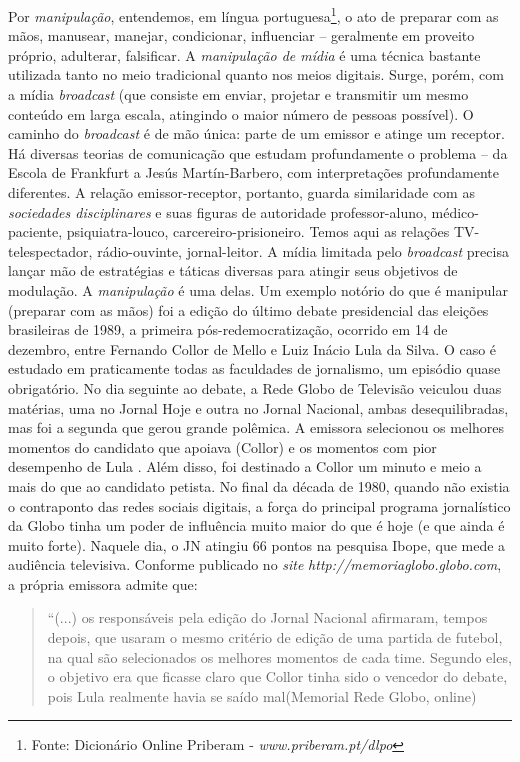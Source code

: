Por \emph{manipulação}, entendemos, em língua portuguesa\footnote{Fonte:
  Dicionário Online Priberam -
  \emph{www.priberam.pt/dlpo}}, o
ato de preparar com as mãos, manusear, manejar, condicionar, influenciar
-- geralmente em proveito próprio, adulterar, falsificar. A
\emph{manipulação de mídia} é uma técnica bastante utilizada tanto no
meio tradicional quanto nos meios digitais. Surge, porém, com a mídia
\emph{broadcast} (que consiste em enviar, projetar e transmitir um mesmo
conteúdo em larga escala, atingindo o maior número de pessoas possível).
O caminho do \emph{broadcast} é de mão única: parte de um emissor e
atinge um receptor. Há diversas teorias de comunicação que estudam
profundamente o problema -- da Escola de Frankfurt a Jesús
Martín-Barbero, com interpretações profundamente diferentes. A relação
emissor-receptor, portanto, guarda similaridade com as \emph{sociedades
disciplinares} e suas figuras de autoridade professor-aluno,
médico-paciente, psiquiatra-louco, carcereiro-prisioneiro. Temos aqui as
relações TV-telespectador, rádio-ouvinte, jornal-leitor. A mídia
limitada pelo \emph{broadcast} precisa lançar mão de estratégias e
táticas diversas para atingir seus objetivos de modulação. A
\emph{manipulação} é uma delas. Um exemplo notório do que é manipular
(preparar com as mãos) foi a edição do último debate presidencial das
eleições brasileiras de 1989, a primeira pós-redemocratização, ocorrido
em 14 de dezembro, entre Fernando Collor de Mello e Luiz Inácio Lula da
Silva. O caso é estudado em praticamente todas as faculdades de
jornalismo, um episódio quase obrigatório. No dia seguinte ao debate, a
Rede Globo de Televisão veiculou duas matérias, uma no Jornal Hoje e
outra no Jornal Nacional, ambas desequilibradas, mas foi a segunda que
gerou grande polêmica. A emissora selecionou os melhores momentos do
candidato que apoiava (Collor) e os momentos com pior desempenho de Lula
. Além disso, foi destinado a Collor um minuto e meio a mais do que ao
candidato petista. No final da década de 1980, quando não existia o
contraponto das redes sociais digitais, a força do principal programa
jornalístico da Globo tinha um poder de influência muito maior do que é
hoje (e que ainda é muito forte). Naquele dia, o JN atingiu 66 pontos na
pesquisa Ibope, que mede a audiência televisiva. Conforme publicado no
\emph{site} \emph{http://memoriaglobo.globo.com}, a própria emissora admite que:

\begin{quote}
``(...) os responsáveis pela edição do Jornal Nacional afirmaram, tempos
depois, que usaram o mesmo critério de edição de uma partida de futebol,
na qual são selecionados os melhores momentos de cada time. Segundo
eles, o objetivo era que ficasse claro que Collor tinha sido o vencedor
do debate, pois Lula realmente havia se saído mal(Memorial Rede Globo,
online)
\end{quote}

